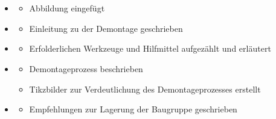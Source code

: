 \section{}
\begin{itemize}
	\item {}
	    \begin{itemize}
		\item Abbildung  eingefügt
    	\end{itemize}
	\item {}
	    \begin{itemize}
		\item Einleitung zu der Demontage geschrieben
      	\end{itemize}
	\item {}
		\begin{itemize}
		\item Erfolderlichen Werkzeuge und Hilfmittel aufgezählt und erläutert
     	\end{itemize}
	\item {}
		\begin{itemize}
		\item Demontageprozess beschrieben
		\item Tikzbilder zur Verdeutlichung des Demontageprozesses erstellt
	    \end{itemize}
	\item {}
		\begin{itemize}
		\item Empfehlungen zur Lagerung der Baugruppe geschrieben
    	\end{itemize}
\end{itemize}



